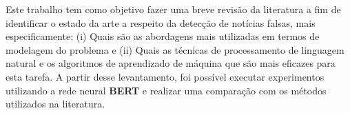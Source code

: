 Este trabalho tem como objetivo fazer uma breve revisão da literatura a fim de identificar o estado da arte a respeito da detecção de notícias falsas, mais especificamente: (i) Quais são as abordagens mais utilizadas em termos de modelagem do problema e (ii) Quais as técnicas de processamento de linguagem natural e os algoritmos de aprendizado de máquina que são mais eficazes para esta tarefa. A partir desse levantamento, foi possível executar experimentos utilizando a rede neural \textbf{BERT} e realizar uma comparação com os métodos utilizados na literatura.



